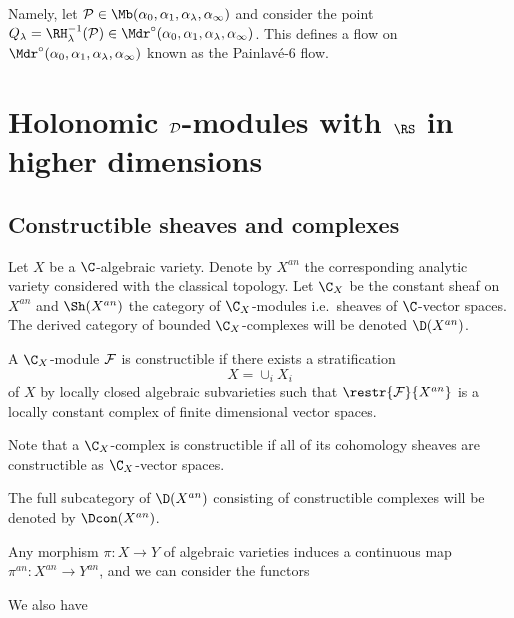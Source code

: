 \documentclass[etingof-dmod.tex]{subfiles}
\begin{document}
Namely, let $\mc{P} \in \Mb(\alpha_0,\alpha_1,\alpha_{\lambda}, \alpha_{\infty})$
and consider the point $Q_{\lambda} = \RH_{\lambda}^{-1}(\mc{P}) \in
\Mdr^{\circ}(\alpha_0,\alpha_1,\alpha_{\lambda}, \alpha_{\infty})$. This
defines a flow on $\Mdr^{\circ}(\alpha_0,\alpha_1,\alpha_{\lambda},
\alpha_{\infty})$ known as the Painlav\'e-6 flow.

\section{Holonomic $\mathcal{D}$-modules with $\RS$ in higher dimensions}

\subsection{Constructible sheaves and complexes}
Let $X$ be a $\C$-algebraic variety. Denote by $X^{an}$ the corresponding
analytic variety considered with the classical topology. Let $\C_X$ be the
constant sheaf on $X^{an}$ and $\Sh(X^{an})$ the category of $\C_X$-modules
i.e.\ sheaves of $\C$-vector spaces. The derived category of bounded $\C_X$-complexes
will be denoted $\D(X^{an})$.

  \begin{defn}
    A $\C_X$-module $\mathcal{F}$ is constructible if there exists a stratification
    $$X = \cup_i X_i$$ of $X$ by locally closed algebraic subvarieties such that
    $\restr{\mc{F}}{X^{an}}$ is a locally constant complex of finite dimensional
    vector spaces.
  \end{defn}

  \begin{rmk}
    Note that a $\C_X$-complex is constructible if all of its cohomology sheaves
    are constructible as $\C_X$-vector spaces.
  \end{rmk}

  The full subcategory of $\D(X^{an})$ consisting of constructible
  complexes will be denoted by $\Dcon(X^{an})$.

  Any morphism $\pi: X \rightarrow Y$ of algebraic varieties induces a
  continuous map $\pi^{an} : X^{an} \rightarrow Y^{an}$, and we can consider the
  functors


  We also have
\end{document}

